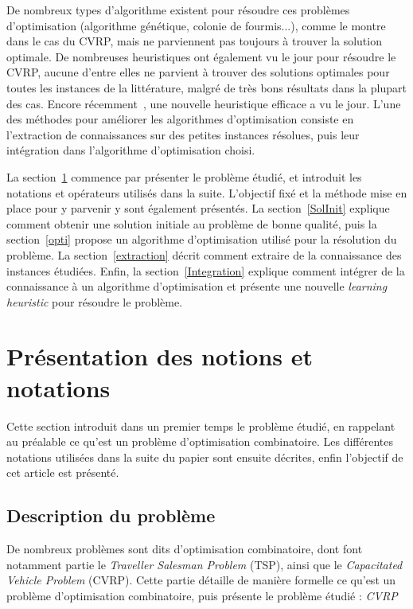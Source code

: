 \documentclass[a4paper,11pt]{article}%
\begin{document}
De nombreux types d'algorithme existent pour résoudre ces problèmes d'optimisation (algorithme génétique, colonie de fourmis...), comme le montre~\cite{synthese} dans le cas du CVRP, mais ne parviennent pas toujours à trouver la solution optimale. 
De nombreuses heuristiques ont également vu le jour pour résoudre le CVRP, aucune d'entre elles ne parvient à trouver des solutions optimales pour toutes les instances de la littérature, malgré de très bons résultats dans la plupart des cas. Encore récemment~\cite{Sorensen_2017}, une nouvelle heuristique efficace a vu le jour. 
L'une des méthodes pour améliorer les algorithmes d'optimisation consiste en l'extraction de connaissances sur des petites instances résolues, puis leur intégration dans l'algorithme d'optimisation choisi.

La section~\ref{presentation} commence par présenter le problème étudié, et introduit les notations et opérateurs utilisés dans la suite. L'objectif fixé et la méthode mise en place pour y parvenir y sont également présentés.
La section~\ref{SolInit} explique comment obtenir une solution initiale au problème de bonne qualité, puis la section~\ref{opti} propose un algorithme d'optimisation utilisé pour la résolution du problème. 
La section~\ref{extraction} décrit comment  extraire de la connaissance des instances étudiées. 
Enfin, la section~\ref{Integration} explique comment intégrer de la connaissance à un algorithme d'optimisation et présente une nouvelle \emph{learning heuristic} pour résoudre le problème. 

\section{Présentation des notions et notations}
\label{presentation}
Cette section introduit dans un premier temps le problème étudié, en rappelant au préalable ce qu'est un problème d'optimisation combinatoire. Les différentes notations utilisées dans la suite du papier sont ensuite décrites, enfin l'objectif de cet article est présenté. 


\subsection{Description du problème}
De nombreux problèmes sont dits d'optimisation combinatoire, dont font notamment partie le \emph{Traveller Salesman Problem} (TSP), ainsi que le \emph{Capacitated Vehicle Problem} (CVRP). Cette partie détaille de manière formelle ce qu'est un problème d'optimisation combinatoire, puis présente le problème étudié : \emph{CVRP}
\end{document}
